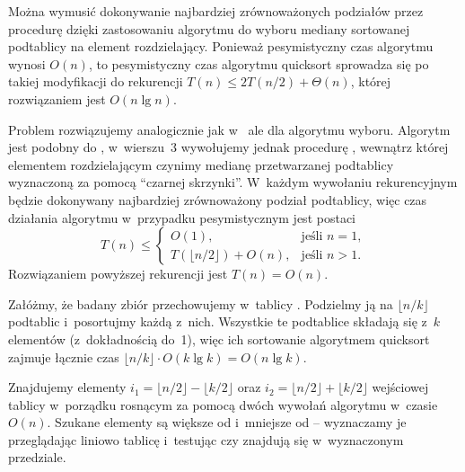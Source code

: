 \exercise %
Można wymusić dokonywanie najbardziej zrównoważonych podziałów przez procedurę  dzięki zastosowaniu algorytmu  do wyboru mediany sortowanej podtablicy na element rozdzielający. Ponieważ pesymistyczny czas algorytmu  wynosi $O(n)$, to pesymistyczny czas algorytmu quicksort sprowadza się po takiej modyfikacji do rekurencji $T(n)\le2T(n/2)+\Theta(n)$, której rozwiązaniem jest $O(n\lg n)$.

\exercise %

\exercise %
Problem rozwiązujemy analogicznie jak w~ ale dla algorytmu wyboru. Algorytm jest podobny do , w~wierszu~3 wywołujemy jednak procedurę , wewnątrz której elementem rozdzielającym czynimy medianę przetwarzanej podtablicy wyznaczoną za pomocą ``czarnej skrzynki''. W~każdym wywołaniu rekurencyjnym będzie dokonywany najbardziej zrównoważony podział podtablicy, więc czas działania algorytmu w~przypadku pesymistycznym jest postaci
\[
	T(n) \le
	\begin{cases}
		O(1), & \text{jeśli $n=1$}, \\
		T(\lfloor n/2\rfloor)+O(n), & \text{jeśli $n>1$}.
	\end{cases}
\]
Rozwiązaniem powyższej rekurencji jest $T(n)=O(n)$.

\exercise %
Załóżmy, że badany zbiór przechowujemy w~tablicy . Podzielmy ją na $\lfloor n/k\rfloor$ podtablic i~posortujmy każdą z~nich. Wszystkie te podtablice składają się z~$k$ elementów (z~dokładnością do~1), więc ich sortowanie algorytmem quicksort zajmuje łącznie czas $\lfloor n/k\rfloor\cdot O(k\lg k)=O(n\lg k)$. %

\exercise %
Znajdujemy elementy $i_1=\lfloor n/2\rfloor-\lfloor k/2\rfloor$ oraz $i_2=\lfloor n/2\rfloor+\lfloor k/2\rfloor$ wejściowej tablicy w~porządku rosnącym za pomocą dwóch wywołań algorytmu  w~czasie $O(n)$. Szukane elementy są większe od  i~mniejsze od  -- wyznaczamy je przeglądając liniowo tablicę i~testując czy znajdują się w~wyznaczonym przedziale.

